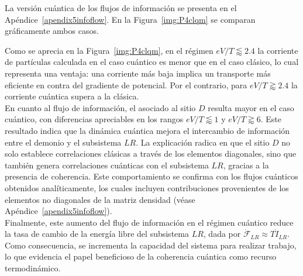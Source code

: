 La versión cuántica de los flujos de información se presenta en el Apéndice~\ref{apendix5infoflow}. En la Figura~\ref{img:P4clqm} se comparan gráficamente ambos casos.


Como se aprecia en la Figura~\ref{img:P4clqm}, en el régimen $eV/T\lessapprox 2.4$ la corriente de partículas calculada en el caso cuántico es menor que en el caso clásico, lo cual representa una ventaja: una corriente más baja implica un transporte más eficiente en contra del gradiente de potencial. Por el contrario, para $eV/T \gtrapprox 2.4$ la corriente cuántica supera a la clásica. 
\\

En cuanto al flujo de información, el asociado al sitio $D$ resulta mayor en el caso cuántico, con diferencias apreciables en los rangos $eV/T \lessapprox 1$ y $eV/T \gtrapprox 6$. Este resultado indica que la dinámica cuántica mejora el intercambio de información entre el demonio y el subsistema $LR$. La explicación radica en que el sitio $D$ no solo establece correlaciones clásicas a través de los elementos diagonales, sino que también genera correlaciones cuánticas con el subsistema $LR$, gracias a la presencia de coherencia. Este comportamiento se confirma con los flujos cuánticos obtenidos analíticamente, los cuales incluyen contribuciones provenientes de los elementos no diagonales de la matriz densidad (véase Apéndice~\ref{apendix5infoflow}).
\\

Finalmente, este aumento del flujo de información en el régimen cuántico reduce la tasa de cambio de la energía libre del subsistema $LR$, dada por $\dot{\mathcal{F}}_{LR} \approx T\dot{I}_{LR}$. Como consecuencia, se incrementa la capacidad del sistema para realizar trabajo, lo que evidencia el papel beneficioso de la coherencia cuántica como recurso termodinámico.

\label{sec5:demonio}



